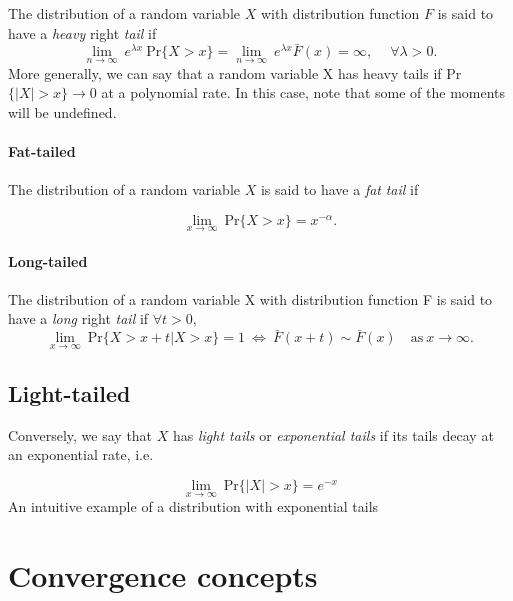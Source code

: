 \documentclass[11pt,a4paper,openany ]{book}
\begin{document}
The distribution of a random variable $X$ with distribution function $F$ is said 
to have a \emph{heavy} right \emph{tail} if 
\begin{equation}
\displaystyle{\lim_{n \to \infty}} \ e^{\lambda x} \ \text{Pr}\{X>x\}=\displaystyle{\lim_{n 
\to \infty}} \ e^{\lambda x} \bar{F}(x)=\infty , \ \quad \forall \lambda>0.
\end{equation}
More generally, we can say that a random variable X has heavy tails if Pr$\{|X|>x\}\to 0$ at 
a polynomial rate. In this case, note that some of the moments will be undefined.

\paragraph*{Fat-tailed}

The distribution of a random variable $X$ is said to have a \emph{fat} \emph{tail} if

\begin{equation}
\displaystyle{\lim_{x \to \infty}} \ \text{Pr}\{X>x\}=x^{-\alpha}.
\end{equation}

\paragraph*{Long-tailed}
The distribution of a random variable X with distribution function F is said to have a \emph{long} 
right \emph{tail} if $\forall t > 0$,
\begin{equation}
\displaystyle{\lim_{x \to \infty}} \ \text{Pr}\{X>x+t|X>x\}=1 \ \Leftrightarrow \ 
\bar{F}(x+t)\sim\bar{F}(x) \quad \text{as} \ x\to\infty.
\end{equation}



\subsection*{Light-tailed}

Conversely, we say that $X$ has \emph{light tails} or \emph{exponential tails} if its tails decay at an exponential rate, i.e. 

\begin{equation}
\displaystyle{\lim_{x \to \infty}} \ \text{Pr}\{|X|>x\}=e^{-x}
\end{equation}
An intuitive example of a distribution with exponential tails


\section{Convergence concepts}\label{convconc}
\end{document}
